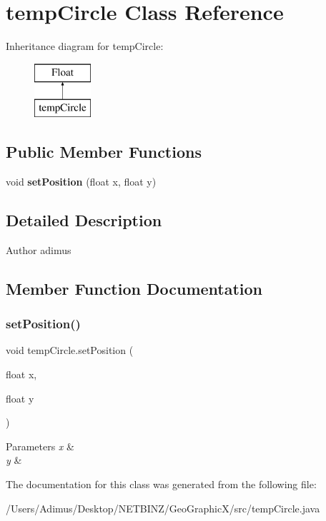 \section{temp\+Circle Class Reference}
\label{classtemp_circle}
Inheritance diagram for temp\+Circle\+:\begin{figure}[H]
\begin{center}
\leavevmode
\includegraphics[height=2.000000cm]{classtemp_circle}
\end{center}
\end{figure}
\subsection*{Public Member Functions}
\begin{DoxyCompactItemize}
\item 
void \textbf{ set\+Position} (float x, float y)
\end{DoxyCompactItemize}


\subsection{Detailed Description}
\begin{DoxyAuthor}{Author}
adimus 
\end{DoxyAuthor}


\subsection{Member Function Documentation}
\mbox{\label{classtemp_circle_a5b1b7cc88f69197e8fdedbe5e74e312e}} 
\subsubsection{set\+Position()}
{\footnotesize\ttfamily void temp\+Circle.\+set\+Position (\begin{DoxyParamCaption}\item[{float}]{x,  }\item[{float}]{y }\end{DoxyParamCaption})}


\begin{DoxyParams}{Parameters}
{\em x} & \\
\hline
{\em y} & \\
\hline
\end{DoxyParams}


The documentation for this class was generated from the following file\+:\begin{DoxyCompactItemize}
\item 
/\+Users/\+Adimus/\+Desktop/\+N\+E\+T\+B\+I\+N\+Z/\+Geo\+Graphic\+X/src/temp\+Circle.\+java\end{DoxyCompactItemize}
